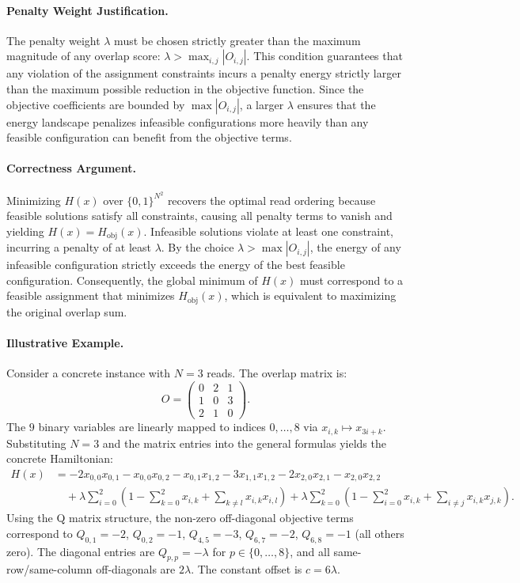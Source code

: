 \documentclass[12pt]{article}
\begin{document}
\paragraph{Penalty Weight Justification.}
The penalty weight $\lambda$ must be chosen strictly greater than the maximum magnitude of any overlap score: $\lambda > \max_{i,j} |O_{i,j}|$. This condition guarantees that any violation of the assignment constraints incurs a penalty energy strictly larger than the maximum possible reduction in the objective function. Since the objective coefficients are bounded by $\max |O_{i,j}|$, a larger $\lambda$ ensures that the energy landscape penalizes infeasible configurations more heavily than any feasible configuration can benefit from the objective terms.

\paragraph{Correctness Argument.}
Minimizing $H(x)$ over $\{0,1\}^{N^2}$ recovers the optimal read ordering because feasible solutions satisfy all constraints, causing all penalty terms to vanish and yielding $H(x) = H_{\text{obj}}(x)$. Infeasible solutions violate at least one constraint, incurring a penalty of at least $\lambda$. By the choice $\lambda > \max |O_{i,j}|$, the energy of any infeasible configuration strictly exceeds the energy of the best feasible configuration. Consequently, the global minimum of $H(x)$ must correspond to a feasible assignment that minimizes $H_{\text{obj}}(x)$, which is equivalent to maximizing the original overlap sum.

\paragraph{Illustrative Example.}
Consider a concrete instance with $N=3$ reads. The overlap matrix is:
\[
O = \begin{pmatrix}
0 & 2 & 1 \\
1 & 0 & 3 \\
2 & 1 & 0
\end{pmatrix}.
\]
The $9$ binary variables are linearly mapped to indices $0,\dots,8$ via $x_{i,k} \mapsto x_{3i+k}$. Substituting $N=3$ and the matrix entries into the general formulas yields the concrete Hamiltonian:
\begin{align}
H(x) &= -2x_{0,0}x_{0,1} - x_{0,0}x_{0,2} - x_{0,1}x_{1,2} - 3x_{1,1}x_{1,2} - 2x_{2,0}x_{2,1} - x_{2,0}x_{2,2} \nonumber \\
&\quad + \lambda \sum_{i=0}^{2} \left( 1 - \sum_{k=0}^{2} x_{i,k} + \sum_{k \neq l} x_{i,k} x_{i,l} \right) + \lambda \sum_{k=0}^{2} \left( 1 - \sum_{i=0}^{2} x_{i,k} + \sum_{i \neq j} x_{i,k} x_{j,k} \right).
\end{align}
Using the Q matrix structure, the non-zero off-diagonal objective terms correspond to $Q_{0,1} = -2$, $Q_{0,2} = -1$, $Q_{4,5} = -3$, $Q_{6,7} = -2$, $Q_{6,8} = -1$ (all others zero). The diagonal entries are $Q_{p,p} = -\lambda$ for $p \in \{0,\dots,8\}$, and all same-row/same-column off-diagonals are $2\lambda$. The constant offset is $c = 6\lambda$.
\end{document}

